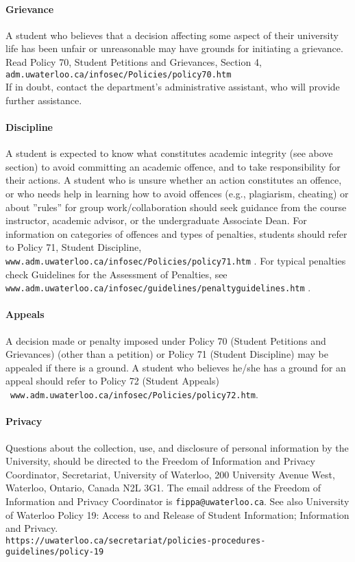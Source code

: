 \documentclass[letterpaper,10pt]{article}
\begin{document}
\paragraph{Grievance}
A student who believes that a decision affecting some aspect of their university life has been unfair or unreasonable may have grounds for initiating a grievance. Read Policy 70, Student Petitions and Grievances, Section 4, \texttt{adm.uwaterloo.ca/infosec/Policies/policy70.htm} \\
If in doubt, contact the department's administrative assistant, who will provide further assistance.

\paragraph{Discipline}
A student is expected to know what constitutes academic integrity (see above section) to avoid committing an academic offence, and to take responsibility for their actions. A student who is unsure whether an action constitutes an offence, or who needs help in learning how to avoid offences (e.g., plagiarism, cheating) or about ''rules'' for group work/collaboration should seek guidance from the course instructor, academic advisor, or the undergraduate Associate Dean. For information on categories of offences and types of penalties, students should refer to Policy 71, Student Discipline, \texttt{www.adm.uwaterloo.ca/infosec/Policies/policy71.htm} . For typical penalties check Guidelines for the Assessment of Penalties, see \\\texttt{www.adm.uwaterloo.ca/infosec/guidelines/penaltyguidelines.htm} .

\paragraph{Appeals}
A decision made or penalty imposed under Policy 70 (Student Petitions and Grievances) (other than a petition) or Policy 71 (Student Discipline) may be appealed if there is a ground. A student who believes he/she has a ground for an appeal should refer to Policy 72 (Student Appeals)\\~\texttt{www.adm.uwaterloo.ca/infosec/Policies/policy72.htm}.

\paragraph{Privacy}
Questions about the collection, use, and disclosure of personal information by the University, should be directed to the Freedom of Information and Privacy Coordinator, Secretariat, University of Waterloo, 200 University Avenue West, Waterloo, Ontario, Canada N2L 3G1. The email address of the Freedom of Information and Privacy Coordinator is \texttt{fippa@uwaterloo.ca}. See also University of Waterloo Policy 19: Access to and Release of Student Information; Information and Privacy.
\\ \texttt{https://uwaterloo.ca/secretariat/policies-procedures-guidelines/policy-19}
\end{document}
